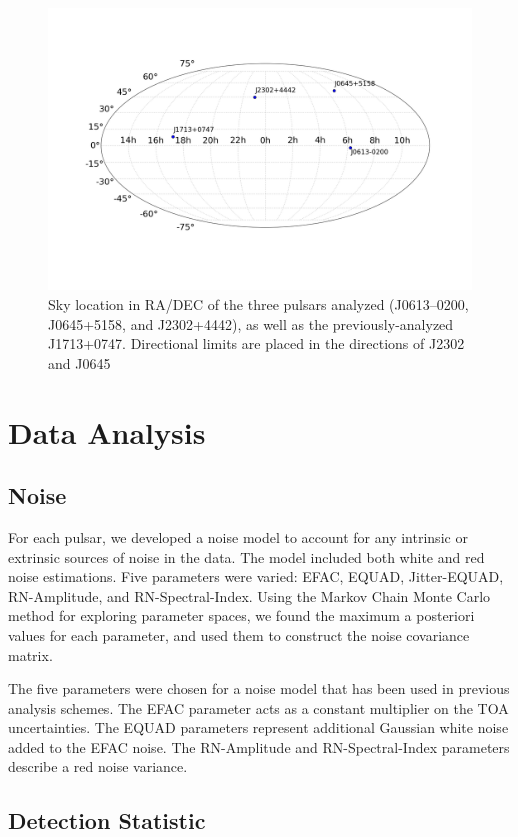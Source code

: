 \documentclass[12pt]{article}
\begin{document}
\begin{figure}[h!]
    \caption{Sky location in RA/DEC of the three pulsars analyzed (J0613--0200,
    J0645+5158, and
J2302+4442), as well as the previously-analyzed J1713+0747. Directional limits
    are placed in the directions of J2302 and J0645}
    \includegraphics[width=\textwidth]{./figures/skyplot.png}
\end{figure}



\section{Data Analysis}
\subsection{Noise}
   For each pulsar, we developed a noise model to account for any intrinsic or
extrinsic sources of noise in the data. The model included both white and red
noise estimations. Five parameters were varied: EFAC, EQUAD, Jitter-EQUAD,
RN-Amplitude, and RN-Spectral-Index. Using the Markov Chain Monte Carlo method
for exploring parameter spaces, we found the maximum a posteriori values for
each parameter, and used them to construct the noise covariance matrix.

The five parameters were chosen for a noise model that has been used in
previous analysis schemes. The EFAC parameter acts as a constant multiplier on
the TOA uncertainties. The EQUAD parameters represent additional Gaussian white
noise added to the EFAC noise. The RN-Amplitude and RN-Spectral-Index parameters
describe a red noise variance. 

\subsection{Detection Statistic}
\end{document}
